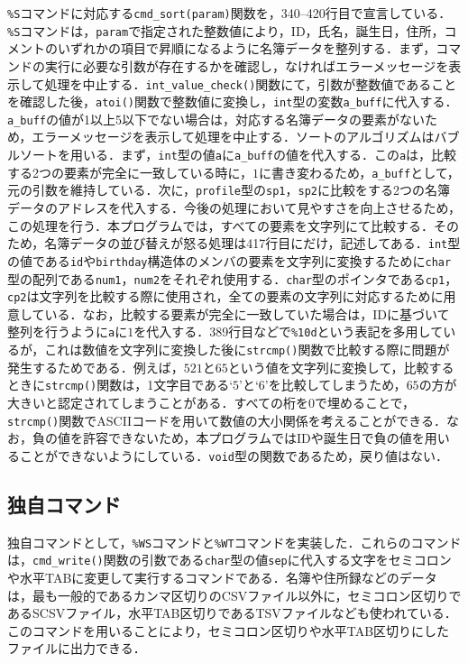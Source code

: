 \verb|%S|コマンドに対応する\verb|cmd_sort(param)|関数を，340--420行目で宣言している．\verb|%S|コマンドは，\verb|param|で指定された整数値により，ID，氏名，誕生日，住所，コメントのいずれかの項目で昇順になるように名簿データを整列する．まず，コマンドの実行に必要な引数が存在するかを確認し，なければエラーメッセージを表示して処理を中止する．\verb|int_value_check()|関数にて，引数が整数値であることを確認した後，\verb|atoi()|関数で整数値に変換し，\verb|int|型の変数\verb|a_buff|に代入する．\verb|a_buff|の値が1以上5以下でない場合は，対応する名簿データの要素がないため，エラーメッセージを表示して処理を中止する．ソートのアルゴリズムはバブルソートを用いる\cite{book:algodata}．まず，\verb|int|型の値\verb|a|に\verb|a_buff|の値を代入する．この\verb|a|は，比較する2つの要素が完全に一致している時に，$1$に書き変わるため，\verb|a_buff|として，元の引数を維持している．次に，\verb|profile|型の\verb|sp1|，\verb|sp2|に比較をする2つの名簿データのアドレスを代入する．今後の処理において見やすさを向上させるため，この処理を行う．本プログラムでは，すべての要素を文字列にて比較する．そのため，名簿データの並び替えが怒る処理は417行目にだけ，記述してある．\verb|int|型の値である\verb|id|や\verb|birthday|構造体のメンバの要素を文字列に変換するために\verb|char|型の配列である\verb|num1|，\verb|num2|をそれぞれ使用する．\verb|char|型のポインタである\verb|cp1|，\verb|cp2|は文字列を比較する際に使用され，全ての要素の文字列に対応するために用意している．なお，比較する要素が完全に一致していた場合は，IDに基づいて整列を行うように\verb|a|に$1$を代入する．389行目などで\verb|%10d|という表記を多用しているが，これは数値を文字列に変換した後に\verb|strcmp()|関数で比較する際に問題が発生するためである．例えば，$521$と$65$という値を文字列に変換して，比較するときに\verb|strcmp()|関数は，1文字目である‘$5$’と‘$6$’を比較してしまうため，$65$の方が大きいと認定されてしまうことがある．すべての桁を0で埋めることで，\verb|strcmp()|関数でASCIIコードを用いて数値の大小関係を考えることができる．なお，負の値を許容できないため，本プログラムではIDや誕生日で負の値を用いることができないようにしている．\verb|void|型の関数であるため，戻り値はない．

\subsection{独自コマンド}

独自コマンドとして，\verb|%WS|コマンドと\verb|%WT|コマンドを実装した．これらのコマンドは，\verb|cmd_write()|関数の引数である\verb|char|型の値\verb|sep|に代入する文字をセミコロンや水平TABに変更して実行するコマンドである．名簿や住所録などのデータは，最も一般的であるカンマ区切りのCSVファイル以外に，セミコロン区切りであるSCSVファイル，水平TAB区切りであるTSVファイルなども使われている．このコマンドを用いることにより，セミコロン区切りや水平TAB区切りにしたファイルに出力できる．

